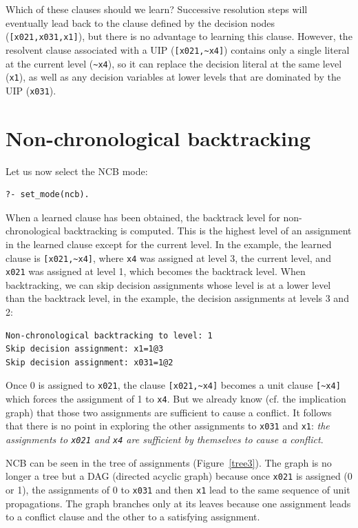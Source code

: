 \documentclass[11pt]{report}
\newcommand*{\p}[1]{\textup{\texttt{#1}}}
\begin{document}
Which of these clauses should we learn? Successive resolution steps will
eventually lead back to the clause defined by the decision nodes
(\verb+[x021,x031,x1]+), but there is no advantage to learning this
clause. However, the resolvent clause associated with a UIP
(\verb+[x021,~x4]+) contains only a single literal at the current level
(\verb+~x4+), so it can replace the decision literal at the same level
(\verb+x1+), as well as any decision variables at lower levels that are
dominated by the UIP (\verb+x031+).


\clearpage

\section{Non-chronological backtracking}

Let us now select the NCB mode:
\begin{verbatim}
?- set_mode(ncb).
\end{verbatim}

When a learned clause has been obtained, the backtrack level for
non-chronological backtracking is computed. This is the highest level of
an assignment in the learned clause except for the current level. In the
example, the learned clause is \verb+[x021,~x4]+, where \p{x4} was
assigned at level 3, the current level, and \p{x021} was assigned at
level 1, which becomes the backtrack level. When backtracking, we can
skip decision assignments whose level is at a lower level than the
backtrack level, in the example, the decision assignments at levels 3
and 2:

\begin{verbatim}
Non-chronological backtracking to level: 1
Skip decision assignment: x1=1@3
Skip decision assignment: x031=1@2
\end{verbatim}

Once 0 is assigned to \p{x021}, the clause \verb+[x021,~x4]+ becomes a
unit clause \verb+[~x4]+ which forces the assignment of 1 to \p{x4}. But
we already know (cf. the implication graph) that those two assignments
are sufficient to cause a conflict. It follows that there is no point in
exploring the other assignments to \p{x031} and \p{x1}: \emph{the
assignments to \p{x021} and \p{x4} are sufficient by themselves to cause
a conflict}.

NCB can be seen in the tree of assignments (Figure~\ref{tree3}). The
graph is no longer a tree but a DAG (directed acyclic graph) because
once \p{x021} is assigned (0 or 1), the assignments of 0 to \p{x031} and
then \p{x1} lead to the same sequence of unit propagations. The graph
branches only at its leaves because one assignment leads to a conflict
clause and the other to a satisfying assignment.
\end{document}
